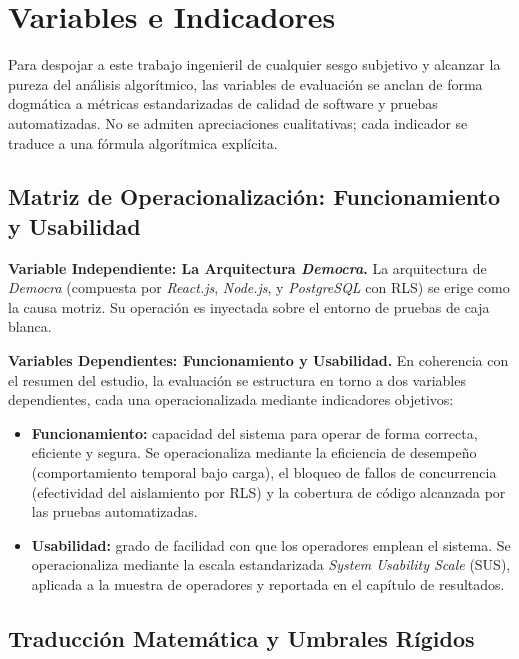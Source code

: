 \section{Variables e Indicadores}

Para despojar a este trabajo ingenieril de cualquier sesgo subjetivo y alcanzar la pureza del an\'alisis algor\'itmico, las variables de evaluaci\'on se anclan de forma dogm\'atica a m\'etricas estandarizadas de calidad de software y pruebas automatizadas. No se admiten apreciaciones cualitativas; cada indicador se traduce a una f\'ormula algor\'itmica expl\'icita.

\subsection{Matriz de Operacionalizaci\'on: Funcionamiento y Usabilidad}

\textbf{Variable Independiente: La Arquitectura \textit{Democra}.} La arquitectura de \textit{Democra} (compuesta por \textit{React.js}, \textit{Node.js}, y \textit{PostgreSQL} con RLS) se erige como la causa motriz. Su operaci\'on es inyectada sobre el entorno de pruebas de caja blanca.

\textbf{Variables Dependientes: Funcionamiento y Usabilidad.} En coherencia con el
resumen del estudio, la evaluaci\'on se estructura en torno a dos variables
dependientes, cada una operacionalizada mediante indicadores objetivos:
\begin{itemize}
    \item \textbf{Funcionamiento:} capacidad del sistema para operar de forma
    correcta, eficiente y segura. Se operacionaliza mediante la eficiencia de
    desempe\~no (comportamiento temporal bajo carga), el bloqueo de fallos de
    concurrencia (efectividad del aislamiento por RLS) y la cobertura de c\'odigo
    alcanzada por las pruebas automatizadas.
    \item \textbf{Usabilidad:} grado de facilidad con que los operadores emplean el
    sistema. Se operacionaliza mediante la escala estandarizada \textit{System
    Usability Scale} (SUS), aplicada a la muestra de operadores y reportada en el
    cap\'itulo de resultados.
\end{itemize}

\subsection{Traducci\'on Matem\'atica y Umbrales R\'igidos}

